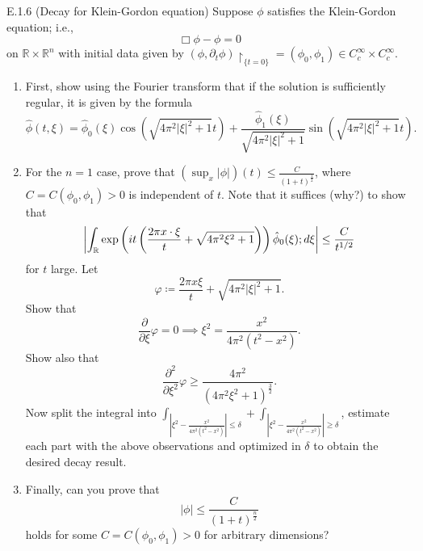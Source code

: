 \documentclass{article}
\begin{document}
\begin{prb}{E.1.6}
	(Decay for Klein-Gordon equation) Suppose $\phi$ satisfies the Klein-Gordon equation; i.e., $$\Box\phi - \phi =0$$ on $\mathbb{R} \times \mathbb{R}^{n}$ with initial data given by $(\phi, \partial_{t}\phi)\upharpoonright_{\{t = 0\}} = (\phi_{0}, \phi_{1}) \in C_{c}^{\infty} \times C_{c}^{\infty}$. \vspace{-0.35cm}
	\begin{enumerate}[itemsep =-2pt,label = (\alph{*})]
		\item First, show using the Fourier transform that if the solution is sufficiently regular, it is given by the formula 
		\begin{equation*}
			\hat{\phi}(t, \xi) = \hat{\phi}_{0}(\xi)\cos(\sqrt{4\pi^{2}|\xi|^{2} + 1}t) + \frac{\hat{\phi}_{1}(\xi)}{\sqrt{4\pi^{2}|\xi|^{2} + 1}}\sin(\sqrt{4\pi^{2}|\xi|^{2} + 1}t). 
		\end{equation*}
		\item For the $n = 1$ case, prove that $(\sup_{x}|\phi|)(t) \leq \frac{C}{(1 + t)^{\frac{1}{2}}}$, where $C = C(\phi_{0}, \phi_{1}) > 0$ is independent of $t$. Note that it suffices (why?) to show that 
		\begin{equation*}
			\left| \int_{\mathbb{R}}\exp\left(it\left(\frac{2\pi x \cdot \xi}{t} + \sqrt{4\pi^{2}\xi^{2} + 1}\right)\right) \hat{\phi}_{0}(\xi);d\xi \right| \leq \frac{C}{t^{1/2}}
		\end{equation*} 
		for $t$ large. Let 
		\begin{equation*}
			\varphi \coloneqq \frac{2\pi x \xi}{t} + \sqrt{4\pi^{2}|\xi|^{2} + 1}. 
		\end{equation*} 
		Show that $$\displaystyle \frac{\partial}{\partial \xi}\varphi = 0 \implies \xi^{2} = \frac{x^{2}}{4\pi^{2}(t^{2} - x^{2})}.$$ Show also that 
		\begin{equation*}
			\frac{\partial^{2}}{\partial \xi^{2}} \varphi \geq \frac{4\pi^{2}}{(4\pi^{2}\xi^{2} + 1)^{\frac{3}{2}}}. 
		\end{equation*}
		Now split the integral into $\int_{|\xi^{2} - \frac{x^{2}}{4\pi^{2}(t^{2} - x^{2})}| \leq \delta} + \int_{|\xi^{2} - \frac{x^{2}}{4\pi^{2}(t^{2} - x^{2})}| \geq \delta}$, estimate each part with the above observations and optimized in $\delta$ to obtain the desired decay result. 
		\item Finally, can you prove that 
		\begin{equation*}
			|\phi| \leq \frac{C}{(1 + t)^{\frac{n}{2}}}
		\end{equation*} 
		holds for some $C = C(\phi_{0}, \phi_{1}) > 0$ for arbitrary dimensions? 
	\end{enumerate}
\end{prb} 
\end{document}
